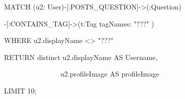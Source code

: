 \textcolor{mygreen}{MATCH}  (u2: User)-[:POSTS\_QUESTION]->(:Question)\par 
-[:CONTAINS\_TAG]->(t:Tag {tagNames: \textcolor{Dandelion}{"???"} })\par
WHERE u2.displayName <> \textcolor{Dandelion}{"???"}  \par
\textcolor{mygreen}{RETURN distinct}  u2.displayName \textcolor{mygreen}{AS}  Username, \par
~~~~~~~~~~~~~~~~u2.profileImage \textcolor{mygreen}{AS}  profileImage \par
\textcolor{mygreen}{LIMIT}  10;